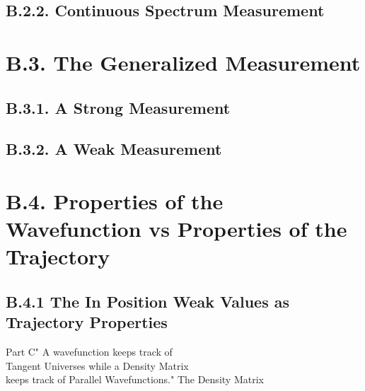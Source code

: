 \documentclass[11pt, a4paper]{article} %
\begin{document}
\subsection*{B.2.2. Continuous Spectrum Measurement}

\section*{B.3. The Generalized Measurement}

\subsection*{B.3.1. A Strong Measurement}
\subsection*{B.3.2. A Weak Measurement}

\section*{B.4. Properties of the Wavefunction vs Properties of the Trajectory}

\subsection*{B.4.1 The In Position Weak Values as Trajectory Properties}

\newpage



\newpage
\begin{kapituloBerria}{Part C}{" A wavefunction keeps track of\\ Tangent Universes while a Density Matrix\\ keeps track of Parallel Wavefunctions."}
The Density Matrix 
\end{kapituloBerria}
\newpage
\null
\fancyhead[L]{\null}
\fancyhead[R]{\null}
\clearpage
\end{document}
